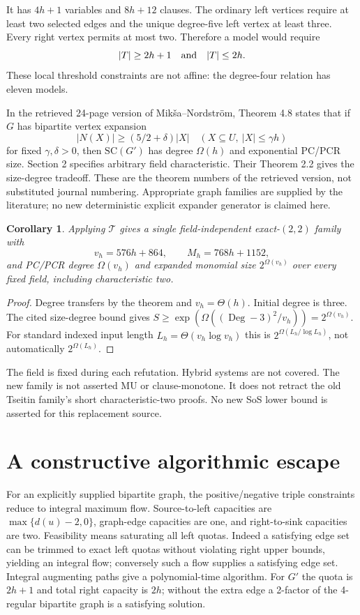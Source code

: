 \documentclass[11pt]{article}
\newtheorem{corollary}[theorem]{Corollary}
\newcommand{\Deg}{\operatorname{Deg}}
\begin{document}
It has $4h+1$ variables and $8h+12$ clauses. The ordinary left vertices require at least two selected edges and the unique degree-five left vertex at least three. Every right vertex permits at most two. Therefore a model would require
\[
 |T|\ge2h+1\quad\hbox{and}\quad |T|\le2h.
\]
These local threshold constraints are not affine: the degree-four relation has eleven models.

In the retrieved 24-page version of Mik\v{s}a--Nordstr\"om, Theorem 4.8 states that if $G$ has bipartite vertex expansion
\[
 |N(X)|\ge(5/2+\delta)|X|\quad
 (X\subseteq U,\ |X|\le\gamma h)
\]
for fixed $\gamma,\delta>0$, then $\mathrm{SC}(G')$ has degree $\Omega(h)$ and exponential PC/PCR size. Section 2 specifies arbitrary field characteristic. Their Theorem 2.2 gives the size-degree tradeoff. These are the theorem numbers of the retrieved version, not substituted journal numbering. Appropriate graph families are supplied by the literature; no new deterministic explicit expander generator is claimed here.

\begin{corollary}
Applying $\mathcal T$ gives a single field-independent exact-$(2,2)$ family with
\[
 v_h=576h+864,\qquad M_h=768h+1152,
\]
and PC/PCR degree $\Omega(v_h)$ and expanded monomial size $2^{\Omega(v_h)}$ over every fixed field, including characteristic two.
\end{corollary}
\begin{proof}
Degree transfers by the theorem and $v_h=\Theta(h)$. Initial degree is three. The cited size-degree bound gives
$S\ge\exp(\Omega((\Deg-3)^2/v_h))=2^{\Omega(v_h)}$.
For standard indexed input length $L_h=\Theta(v_h\log v_h)$ this is $2^{\Omega(L_h/\log L_h)}$, not automatically $2^{\Omega(L_h)}$.
\end{proof}
The field is fixed during each refutation. Hybrid systems are not covered. The new family is not asserted MU or clause-monotone. It does not retract the old Tseitin family's short characteristic-two proofs. No new SoS lower bound is asserted for this replacement source.

\section{A constructive algorithmic escape}
For an explicitly supplied bipartite graph, the positive/negative triple constraints reduce to integral maximum flow. Source-to-left capacities are $\max\{d(u)-2,0\}$, graph-edge capacities are one, and right-to-sink capacities are two. Feasibility means saturating all left quotas. Indeed a satisfying edge set can be trimmed to exact left quotas without violating right upper bounds, yielding an integral flow; conversely such a flow supplies a satisfying edge set. Integral augmenting paths give a polynomial-time algorithm. For $G'$ the quota is $2h+1$ and total right capacity is $2h$; without the extra edge a 2-factor of the 4-regular bipartite graph is a satisfying solution.
\end{document}

